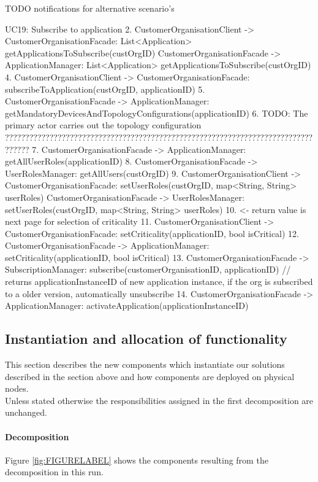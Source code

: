             TODO notifications for alternative scenario's

        UC19: Subscribe to application
            2. CustomerOrganisationClient -> CustomerOrganisationFacade: List<Application> getApplicationsToSubscribe(custOrgID)
                   CustomerOrganisationFacade -> ApplicationManager: List<Application> getApplicationsToSubscribe(custOrgID)
            4. CustomerOrganisationClient -> CustomerOrganisationFacade: subscribeToApplication(custOrgID, applicationID)
            5. CustomerOrganisationFacade -> ApplicationManager: getMandatoryDevicesAndTopologyConfigurations(applicationID)
            6. TODO: The primary actor carries out the topology configuration ??????????????????????????????????????????????????????????????????????????????????
            7. CustomerOrganisationFacade -> ApplicationManager: getAllUserRoles(applicationID)
            8. CustomerOrganisationFacade -> UserRolesManager: getAllUsers(custOrgID)
            9. CustomerOrganisationClient -> CustomerOrganisationFacade: setUserRoles(custOrgID, map<String, String> userRoles)
                   CustomerOrganisationFacade -> UserRolesManager: setUserRoles(custOrgID, map<String, String> userRoles)
                   10. <- return value is next page for selection of criticality
            11. CustomerOrganisationClient -> CustomerOrganisationFacade: setCriticality(applicationID, bool isCritical)
                    12. CustomerOrganisationFacade -> ApplicationManager: setCriticality(applicationID, bool isCritical)
            13. CustomerOrganisationFacade -> SubscriptionManager: subscribe(customerOrganisationID, applicationID) // returns applicationInstanceID of new application instance, if the org is subscribed to a older version, automatically unsubscribe
            14. CustomerOrganisationFacade -> ApplicationManager: activateApplication(applicationInstanceID)


\subsection{Instantiation and allocation of functionality}
    This section describes the new components which instantiate our solutions described
    in the section above and how components are deployed on physical nodes. \\
    Unless stated otherwise the responsibilities assigned in the first decomposition are unchanged.

    \paragraph{Decomposition}
        Figure \ref{fig:FIGURELABEL} shows the components resulting from the
        decomposition in this run.


